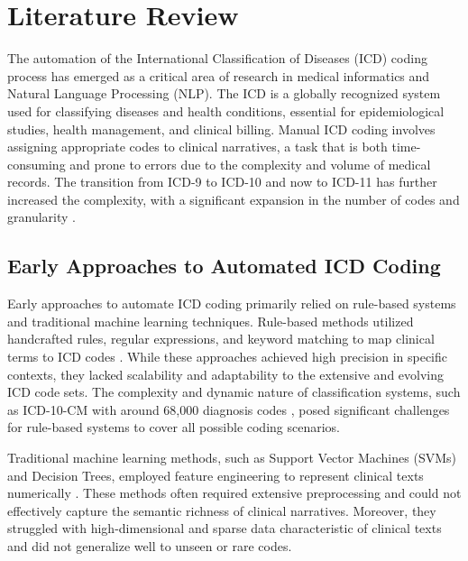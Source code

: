 \documentclass[12pt,a4paper]{report}
\begin{document}
\tableofcontents
\newpage


\chapter{Literature Review}

The automation of the International Classification of Diseases (ICD) coding process has emerged as a critical area of research in medical informatics and Natural Language Processing (NLP). The ICD is a globally recognized system used for classifying diseases and health conditions, essential for epidemiological studies, health management, and clinical billing. Manual ICD coding involves assigning appropriate codes to clinical narratives, a task that is both time-consuming and prone to errors due to the complexity and volume of medical records. The transition from ICD-9 to ICD-10 and now to ICD-11 has further increased the complexity, with a significant expansion in the number of codes and granularity \cite{who2019icd11}.

\section{Early Approaches to Automated ICD Coding}

Early approaches to automate ICD coding primarily relied on rule-based systems and traditional machine learning techniques. Rule-based methods utilized handcrafted rules, regular expressions, and keyword matching to map clinical terms to ICD codes \cite{farkas2008automatic, scheurwegs2017data}. While these approaches achieved high precision in specific contexts, they lacked scalability and adaptability to the extensive and evolving ICD code sets. The complexity and dynamic nature of classification systems, such as ICD-10-CM with around 68,000 diagnosis codes \cite{dong2022automated}, posed significant challenges for rule-based systems to cover all possible coding scenarios.

Traditional machine learning methods, such as Support Vector Machines (SVMs) and Decision Trees, employed feature engineering to represent clinical texts numerically \cite{perotte2014diagnosis}. These methods often required extensive preprocessing and could not effectively capture the semantic richness of clinical narratives. Moreover, they struggled with high-dimensional and sparse data characteristic of clinical texts and did not generalize well to unseen or rare codes.
\end{document}
